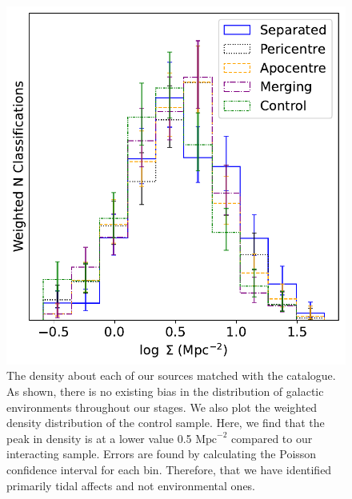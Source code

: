 \begin{figure}
\centering
\includegraphics[width=\textwidth]{Chapter3/figures/density-stage.pdf}
\caption[The density about each of our sources matched with the \citet{2017ApJ...837...16D} catalogue.]{The density about each of our sources matched with the \citet{2017ApJ...837...16D} catalogue. As shown, there is no existing bias in the distribution of galactic environments throughout our stages. We also plot the weighted density distribution of the control sample. Here, we find that the peak in density is at a lower value 0.5 $\textrm{Mpc}^{-2}$ compared to our interacting sample. Errors are found by calculating the Poisson confidence interval for each bin. Therefore, that we have identified primarily tidal affects and not environmental ones.}
\label{fig:dens-stage}
\end{figure}

